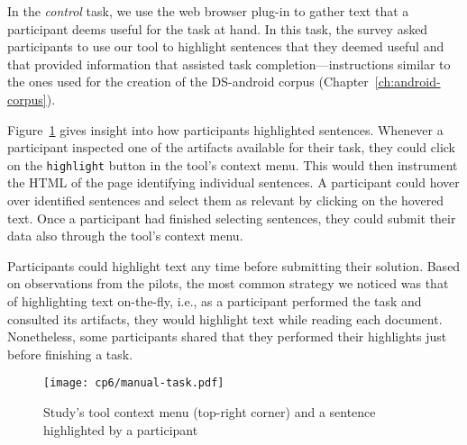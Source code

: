 
In the \textit{control} task, we use the web browser plug-in to gather text that a participant deems useful for the task at hand. In this task, 
the survey asked participants to use our tool to highlight sentences that they deemed useful and that provided information that assisted task completion---instructions similar to the ones used for the creation of the \acs{DS-android} corpus (Chapter~\ref{ch:android-corpus}). 




Figure~\ref{fig:artifact-pre-highlight}
gives insight into how participants highlighted sentences. 
Whenever a participant inspected one of the artifacts available for their task, 
they could click on the \texttt{highlight} button in the tool's context menu.  
This would then instrument the HTML of the page identifying individual sentences. 
A participant could hover over identified sentences and select them as relevant by clicking on the hovered text.
Once a participant had finished selecting sentences, they could submit 
their data also through the tool's context menu.

Participants could highlight text any time before submitting their solution. 
Based on observations from the pilots, the most common strategy we noticed was that of highlighting 
text on-the-fly, i.e., as a participant performed the task and consulted its artifacts, they would highlight text 
while reading each document. Nonetheless, some participants 
shared that they performed their highlights just before finishing a task.





\begin{figure}
    \centering
    \texttt{[image: cp6/manual-task.pdf]}
    \caption{Study's tool context menu (top-right corner) and a sentence highlighted by a participant}
    \label{fig:artifact-pre-highlight}
\end{figure}




